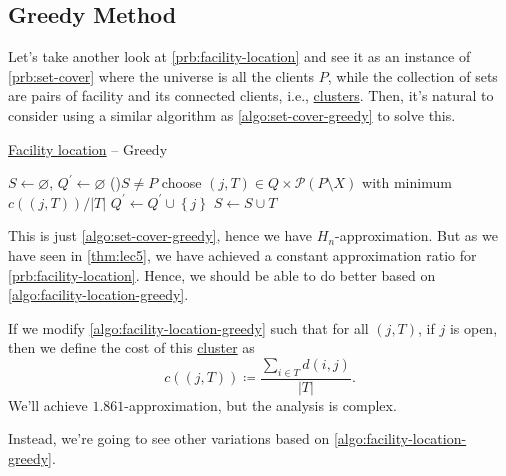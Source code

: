 \subsection{Greedy Method}
Let's take another look at \autoref{prb:facility-location} and see it as an instance of \autoref{prb:set-cover} where the universe is all the clients \(P\), while the collection of sets are pairs of facility and its connected clients, i.e., \hyperref[def:cluster]{clusters}. Then, it's natural to consider using a similar algorithm as \autoref{algo:set-cover-greedy} to solve this.

\begin{algorithm}[H]\label{algo:facility-location-greedy}
	\DontPrintSemicolon
	\caption{\hyperref[prb:facility-location]{Facility location} -- Greedy}
	\BlankLine

	\(S \gets \varnothing \), \(Q^\prime \gets \varnothing\)\;
	\While(){\(S \neq P \)}{
		choose \((j, T)\in Q \times \mathcal{P} (P\setminus X)\) with minimum \(c((j, T)) / \left\vert T \right\vert \)\;
		\(Q^\prime \gets Q^\prime  \cup \left\{ j \right\}\)\;
		\(S \gets S \cup T\)\;
	}
	\;
\end{algorithm}

This is just \autoref{algo:set-cover-greedy}, hence we have \(H_n\)-approximation. But as we have seen in \autoref{thm:lec5}, we have achieved a constant approximation ratio for \autoref{prb:facility-location}. Hence, we should be able to do better based on \autoref{algo:facility-location-greedy}.

\begin{remark}
	If we modify \autoref{algo:facility-location-greedy} such that for all \((j, T)\), if \(j\) is open, then we define the cost of this \hyperref[def:cluster]{cluster} as
	\[
		c((j, T))\coloneqq \frac{\sum_{i\in T} d(i, j)}{\left\vert T \right\vert }.
	\]
	We'll achieve \(1.861\)-approximation, but the analysis is complex.
\end{remark}

Instead, we're going to see other variations based on \autoref{algo:facility-location-greedy}.

